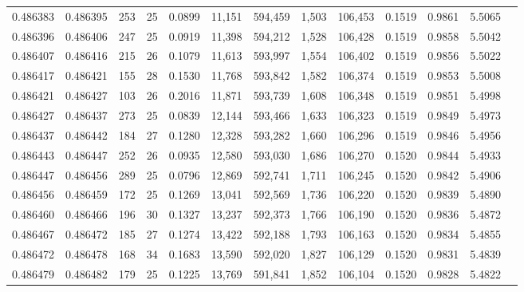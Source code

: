 \begin{tabular}{rrrrrrrrrrrrr}
0.486383 & 0.486395 & 253 &  25 &                                     0.0899 &  11,151 & 594,459 &   1,503 & 106,453 & 0.1519 & 0.9861 & 5.5065 \\
0.486396 & 0.486406 & 247 &  25 &                                     0.0919 &  11,398 & 594,212 &   1,528 & 106,428 & 0.1519 & 0.9858 & 5.5042 \\
0.486407 & 0.486416 & 215 &  26 &                                     0.1079 &  11,613 & 593,997 &   1,554 & 106,402 & 0.1519 & 0.9856 & 5.5022 \\
0.486417 & 0.486421 & 155 &  28 &                                     0.1530 &  11,768 & 593,842 &   1,582 & 106,374 & 0.1519 & 0.9853 & 5.5008 \\
0.486421 & 0.486427 & 103 &  26 &                                     0.2016 &  11,871 & 593,739 &   1,608 & 106,348 & 0.1519 & 0.9851 & 5.4998 \\
0.486427 & 0.486437 & 273 &  25 &                                     0.0839 &  12,144 & 593,466 &   1,633 & 106,323 & 0.1519 & 0.9849 & 5.4973 \\
0.486437 & 0.486442 & 184 &  27 &                                     0.1280 &  12,328 & 593,282 &   1,660 & 106,296 & 0.1519 & 0.9846 & 5.4956 \\
0.486443 & 0.486447 & 252 &  26 &                                     0.0935 &  12,580 & 593,030 &   1,686 & 106,270 & 0.1520 & 0.9844 & 5.4933 \\
0.486447 & 0.486456 & 289 &  25 &                                     0.0796 &  12,869 & 592,741 &   1,711 & 106,245 & 0.1520 & 0.9842 & 5.4906 \\
0.486456 & 0.486459 & 172 &  25 &                                     0.1269 &  13,041 & 592,569 &   1,736 & 106,220 & 0.1520 & 0.9839 & 5.4890 \\
0.486460 & 0.486466 & 196 &  30 &                                     0.1327 &  13,237 & 592,373 &   1,766 & 106,190 & 0.1520 & 0.9836 & 5.4872 \\
0.486467 & 0.486472 & 185 &  27 &                                     0.1274 &  13,422 & 592,188 &   1,793 & 106,163 & 0.1520 & 0.9834 & 5.4855 \\
0.486472 & 0.486478 & 168 &  34 &                                     0.1683 &  13,590 & 592,020 &   1,827 & 106,129 & 0.1520 & 0.9831 & 5.4839 \\
0.486479 & 0.486482 & 179 &  25 &                                     0.1225 &  13,769 & 591,841 &   1,852 & 106,104 & 0.1520 & 0.9828 & 5.4822 \\

\end{tabular}
